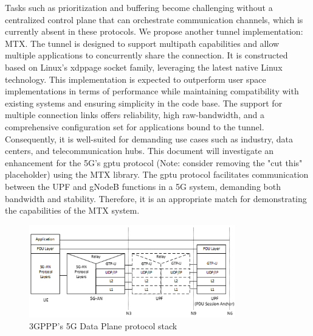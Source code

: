 Tasks such as prioritization and buffering become challenging without a centralized control plane that can orchestrate communication channels, which is currently absent in these protocols.
%
We propose another tunnel implementation: \ac{MTX}. 
The tunnel is designed to support multipath capabilities and allow multiple applications to concurrently share the connection. 
It is constructed based on Linux's \ac{xdppage} socket family, leveraging the latest native Linux technology. 
This implementation is expected to outperform user space implementations in terms of performance while maintaining compatibility with existing systems and ensuring simplicity in the code base.
The support for multiple connection links offers reliability, high raw-bandwidth, and a comprehensive configuration set for applications bound to the tunnel. 
Consequently, it is well-suited for demanding use cases such as industry, data centers, and telecommunication hubs.
This document will investigate an enhancement for the 5G's \ac{gptu} protocol (Note: consider removing the "cut this" placeholder) using the \ac{MTX} library. 
The \ac{gptu} protocol facilitates communication between the UPF and gNodeB functions in a 5G system, demanding both bandwidth and stability. 
Therefore, it is an appropriate match for demonstrating the capabilities of the \ac{MTX} system. 
%

\begin{figure}[H]
	\centering
	\includegraphics[width=0.8\textwidth]{resources/images/3gpp_5g_data_plane_protocol.png}
	\caption{3GPPP's 5G Data Plane protocol stack \cite{3gpp_5g_system_overview}}
    \label{fig:introduction:3gpp_5g_data_plane_protocol}
\end{figure}


